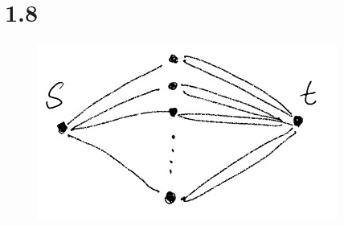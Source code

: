 \documentclass{article}
\begin{document}
\section{1.8}

\begin{figure}[h]
	\centering
	\includegraphics{graph1.jpg}
\end{figure}
\end{document}
